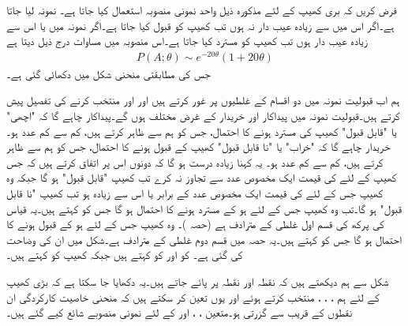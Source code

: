 \quad
فرض کریں کہ بری کھیپ کے لئے مذکورہ ذیل واحد نمونی منصوبہ استعمال کیا جاتا ہے۔ نمونہ لیا جاتا ہے۔اگر اس میں  سے زیادہ عیب دار نہ ہوں تب کھیپ کو قبول کیا جاتا ہے۔اگر نمونہ میں  یا اس سے زیادہ عیب دار ہوں تب کھیپ کو مسترد کیا جاتا ہے۔اس منصوبہ میں مساوات  درج ذیل دیتا ہے
\begin{align*}
P(A;\theta)\sim e^{-20\theta} (1+20\theta)
\end{align*}
جس کی مطابقتی منحنی شکل  میں دکھائی گئی ہے۔

ہم اب قبولیت نمونہ میں دو اقسام کے غلطیوں پر غور کرتے ہیں اور  اور  منتخب کرنے کی تفصیل پیش کرتے ہیں۔قبولیت نمونہ میں پیداکار اور خریدار کے غرض مختلف ہوں گے۔پیداکار چاہے گا کہ "اچھی" یا "قابل قبول" کھیپ کی مسترد ہونے کا احتمال، جس کو ہم  سے ظاہر کرتے ہیں، کم سے کم  عدد  ہو۔ خریدار چاہے گا کہ "خراب" یا "نا قابل قبول" کھیپ کے قبول ہونے کا احتمال، جس کو ہم  سے ظاہر کرتے ہیں، کم سے کم عدد ہو۔ یہ کہنا زیادہ درست ہو گا کہ دونوں اس پر اتفاق کرتے ہیں کہ جس کھیپ کے لئے  کی قیمت ایک مخصوص عدد  سے تجاوز نہ کرے تب کھیپ "قابل قبول"  ہو  گا جبکہ وہ کھیپ جس کے لئے   کی قیمت ایک مخصوص عدد   کے برابر یا اس  سے زیادہ ہو تب کھیپ "نا قابل قبول" ہو گا۔تب وہ کھیپ جس کے لئے  ہو کے مسترد ہونے  کا احتمال  ہو گا جس کو  کہتے ہیں۔یہ قیاس کی پرکھ کی قسم اول غلطی  کے مترادف ہے (حصہ )۔  وہ کھیپ جس کے لئے  ہو کے قبول ہونے  کا احتمال  ہو گا جس کو  کہتے ہیں۔یہ حصہ  میں قسم دوم  غلطی  کے مترادف ہے۔شکل میں ان کی وضاحت کی گئی ہے۔  کو  اور  کو  کہتے ہیں جبکہ کھیپ  کو  کہتے ہیں۔

شکل سے ہم دیکھتے ہیں کہ نقطہ  اور  نقطہ   پر پائے جاتے ہیں۔یہ دکھایا جا سکتا ہے کہ بڑی کھیپ کے لئے ہم ، ، ،  منتخب کرتے ہوئے  اور  یوں تعین کر سکتے ہیں کہ منحنی خاصیت کارکردگی ان نقطوں کے قریب سے گزرتی ہو۔متعین ، ،  اور  کے لئے نمونی منصوبے شائع کیے گئے ہیں۔ 

